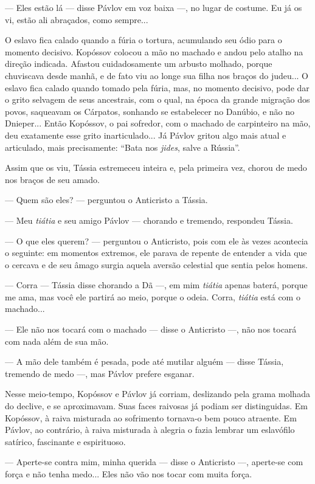 --- Eles estão lá --- disse Pávlov em voz baixa ---, no lugar de
costume. Eu já os vi, estão ali abraçados, como sempre...

O eslavo fica calado quando a fúria o tortura, acumulando seu ódio para
o momento decisivo. Kopóssov colocou a mão no machado e andou pelo
atalho na direção indicada. Afastou cuidadosamente um arbusto molhado,
porque chuviscava desde manhã, e de fato viu ao longe sua filha nos
braços do judeu... O eslavo fica calado quando tomado pela fúria, mas,
no momento decisivo, pode dar o grito selvagem de seus ancestrais, com o
qual, na época da grande migração dos povos, saqueavam os Cárpatos,
sonhando se estabelecer no Danúbio, e não no Dnieper... Então Kopóssov,
o pai sofredor, com o machado de carpinteiro na mão, deu exatamente esse
grito inarticulado... Já Pávlov gritou algo mais atual e articulado,
mais precisamente: ``Bata nos \emph{jides}, salve a Rússia''.

Assim que os viu, Tássia estremeceu inteira e, pela primeira vez, chorou
de medo nos braços de seu amado.

--- Quem são eles? --- perguntou o Anticristo a Tássia.

--- Meu \emph{tiátia} e seu amigo Pávlov --- chorando e tremendo,
respondeu Tássia.

--- O que eles querem? --- perguntou o Anticristo, pois com ele às vezes
acontecia o seguinte: em momentos extremos, ele parava de repente de
entender a vida que o cercava e de seu âmago surgia aquela aversão
celestial que sentia pelos homens.

--- Corra --- Tássia disse chorando a Dã ---, em mim \emph{tiátia}
apenas baterá, porque me ama, mas você ele partirá ao meio, porque o
odeia. Corra, \emph{tiátia} está com o machado...

--- Ele não nos tocará com o machado --- disse o Anticristo ---, não nos
tocará com nada além de sua mão.

--- A mão dele também é pesada, pode até mutilar alguém --- disse
Tássia, tremendo de medo ---, mas Pávlov prefere esganar.

Nesse meio-tempo, Kopóssov e Pávlov já corriam, deslizando pela grama
molhada do declive, e se aproximavam. Suas faces raivosas já podiam ser
distinguidas. Em Kopóssov, à raiva misturada ao sofrimento tornava-o bem
pouco atraente. Em Pávlov, ao contrário, à raiva misturada à alegria o
fazia lembrar um eslavófilo satírico, fascinante e espirituoso.

--- Aperte-se contra mim, minha querida --- disse o Anticristo ---,
aperte-se com força e não tenha medo... Eles não vão nos tocar com muita
força.

